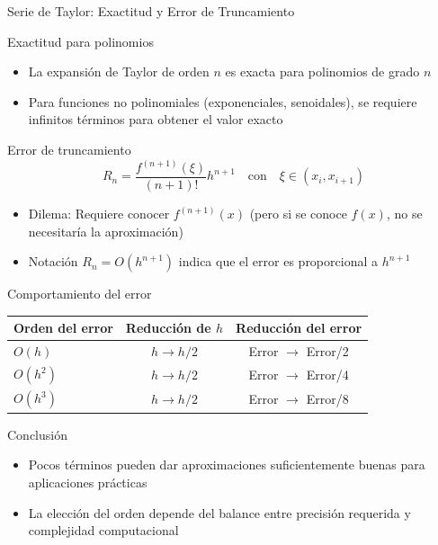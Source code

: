 \documentclass[main.tex]{subfiles}
\begin{document}
\begin{frame}{Serie de Taylor: Exactitud y Error de Truncamiento}
\begin{block}{Exactitud para polinomios}
\begin{itemize}
\item La expansión de Taylor de orden $n$ es \alert{exacta} para polinomios de grado $n$
\item Para funciones no polinomiales (exponenciales, senoidales), se requiere \alert{infinitos términos} para obtener el valor exacto
\end{itemize}
\end{block}

\begin{block}{Error de truncamiento}
\[ R_n = \frac{f^{(n+1)}(\xi)}{(n+1)!}h^{n+1} \quad \text{con} \quad \xi \in (x_i, x_{i+1}) \]
\begin{itemize}
\item \alert{Dilema}: Requiere conocer $f^{(n+1)}(x)$ (pero si se conoce $f(x)$, no se necesitaría la aproximación)
\item Notación $R_n=O(h^{n+1})$ indica que el error es proporcional a $h^{n+1}$
\end{itemize}
\end{block}
\end{frame}

\begin{frame}{Comportamiento del error}
\begin{tabular}{lcc}
\toprule
\textbf{Orden del error} & \textbf{Reducción de $h$} & \textbf{Reducción del error} \\
\midrule
$O(h)$ & $h \to h/2$ & Error $\to$ Error/2 \\
$O(h^2)$ & $h \to h/2$ & Error $\to$ Error/4 \\
$O(h^3)$ & $h \to h/2$ & Error $\to$ Error/8 \\
\bottomrule
\end{tabular}


\begin{alertblock}{Conclusión}
\begin{itemize}
\item Pocos términos pueden dar aproximaciones \alert{suficientemente buenas} para aplicaciones prácticas
\item La elección del orden depende del balance entre \alert{precisión requerida} y \alert{complejidad computacional}
\end{itemize}
\end{alertblock}
\end{frame}
\end{document}

